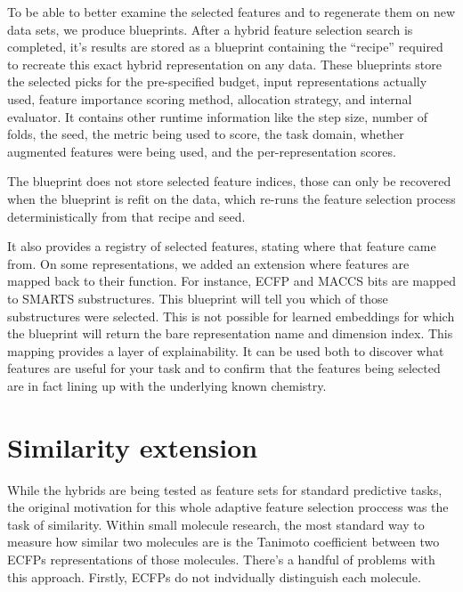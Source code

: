 {%
To be able to better examine the selected features and to regenerate them on new data sets, we produce blueprints. After a hybrid feature selection search is completed, it's results are stored as a blueprint containing the ``recipe'' required to recreate this exact hybrid representation on any data. These blueprints store the selected picks for the pre-specified budget,  input representations actually used, feature importance scoring method, allocation strategy, and internal evaluator. It contains other runtime information like the step size, number of folds, the seed, the metric being used to score, the task domain, whether augmented features were being used, and the per-representation scores. 

The blueprint does not store selected feature indices, those can only be recovered when the blueprint is refit on the data, which re-runs the feature selection process deterministically from that recipe and seed. 

It also provides a registry of selected features, stating where that feature came from. On some representations, we added an extension where features are mapped back to their function. For instance, ECFP and MACCS bits are mapped to SMARTS substructures. This blueprint will tell you which of those substructures were selected. This is not possible for learned embeddings for which the blueprint will return the bare representation name and dimension index. This mapping provides a layer of explainability. It can be used both to discover what features are useful for your task and to confirm that the features being selected are in fact lining up with the underlying known chemistry. 

\section{Similarity extension}

While the hybrids are being tested as feature sets for standard predictive tasks, the original motivation for this whole adaptive feature selection proccess was the task of similarity. 
Within small molecule research, the most standard way to measure how similar two molecules are is the Tanimoto coefficient between two ECFPs representations of those molecules. There's a handful of problems with this approach. Firstly, ECFPs do not indvidually distinguish each molecule. 


}
